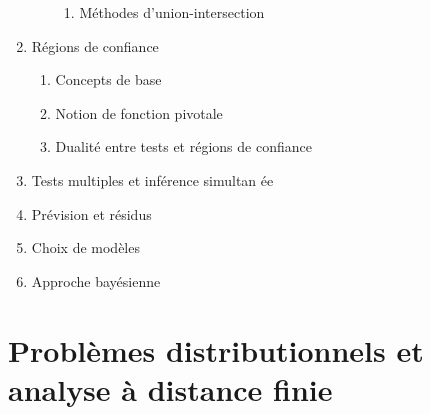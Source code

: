 \documentclass[titlepage,11pt,amstex]{article}
\begin{document}
\begin{enumerate}
\begin{enumerate}
\begin{enumerate}
\item M\'{e}thodes d'union-intersection
\end{enumerate}
\end{enumerate}

\item \label{Confidence regions}R\'{e}gions de confiance

\begin{enumerate}
\item Concepts de base

\item Notion de fonction pivotale

\item Dualit\'{e} entre tests et r\'{e}gions de confiance
\end{enumerate}

\item \label{Simultaneous inference}Tests multiples et inf\'{e}rence simultan%
\'{e}e

\item \label{Prediction}Pr\'{e}vision et r\'{e}sidus

\item \label{Model selection}Choix de mod\`{e}les

\item \label{Bayesian approach}Approche bay\'{e}sienne
\end{enumerate}

\section{Probl\`{e}mes distributionnels et analyse \`{a} distance finie}
\end{document}
